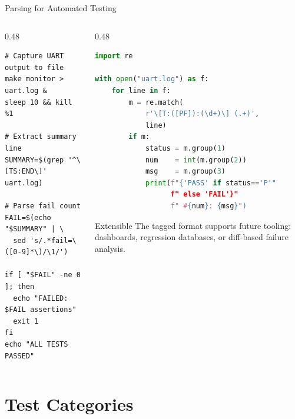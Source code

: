 \documentclass[aspectratio=169, 10pt]{beamer}
\begin{document}
\begin{frame}[fragile]{Parsing for Automated Testing}
\begin{columns}[T]
\begin{column}{0.48\textwidth}
\begin{lstlisting}[style=bashstyle, title={Shell: check pass/fail}]
# Capture UART output to file
make monitor > uart.log &
sleep 10 && kill %1

# Extract summary line
SUMMARY=$(grep '^\[TS:END\]' uart.log)

# Parse fail count
FAIL=$(echo "$SUMMARY" | \
  sed 's/.*fail=\([0-9]*\)/\1/')

if [ "$FAIL" -ne 0 ]; then
  echo "FAILED: $FAIL assertions"
  exit 1
fi
echo "ALL TESTS PASSED"
\end{lstlisting}
\end{column}

\begin{column}{0.48\textwidth}
\begin{lstlisting}[language=Python, style=cstyle, title={Python: parse all results}]
import re

with open("uart.log") as f:
    for line in f:
        m = re.match(
            r'\[T:([PF]):(\d+)\] (.+)',
            line)
        if m:
            status = m.group(1)
            num    = int(m.group(2))
            msg    = m.group(3)
            print(f"{'PASS' if status=='P'"
                  f" else 'FAIL'}"
                  f" #{num}: {msg}")
\end{lstlisting}

\vspace{0.3em}
\begin{block}{Extensible}
The tagged format supports future tooling: dashboards,
regression databases, or diff-based failure analysis.
\end{block}
\end{column}
\end{columns}
\end{frame}

\section{Test Categories}
\end{document}
